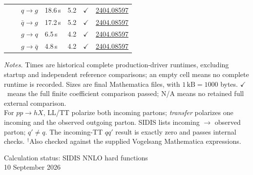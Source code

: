 \documentclass[11pt,a4paper]{article}
\newcommand{\verified}{\textcolor{green!45!black}{\ensuremath{\checkmark}}}
\begin{document}
\begin{center}
\begin{tabular}{|C{2.5cm}|C{1.2cm}|C{2.7cm}|C{2.0cm}|C{1.7cm}|C{1.8cm}|C{2.6cm}|}
 &  & $q\to g$ & 18.6\,s & 5.2 & \verified & \href{https://arxiv.org/abs/2404.08597v3}{2404.08597} \\
 &  & $\bar q\to g$ & 17.2\,s & 5.2 & \verified & \href{https://arxiv.org/abs/2404.08597v3}{2404.08597} \\
 &  & $g\to q$ & 6.5\,s & 4.2 & \verified & \href{https://arxiv.org/abs/2404.08597v3}{2404.08597} \\
 &  & $g\to \bar q$ & 4.8\,s & 4.2 & \verified & \href{https://arxiv.org/abs/2404.08597v3}{2404.08597} \\
\hline
\end{tabular}
\end{center}
\vspace{4pt}
{\footnotesize
\textit{Notes.} Times are historical complete production-driver runtimes,
excluding startup and independent reference comparisons; an empty cell means
no complete runtime is recorded. Sizes are final Mathematica files, with
$1\,\mathrm{kB}=1000$ bytes. \verified\ means the full finite coefficient
comparison passed; N/A means no retained full external comparison.\\[4pt]
For $pp\to hX$, LL/TT polarize both incoming partons; \emph{transfer} polarizes
one incoming and the observed outgoing parton. SIDIS lists incoming $\to$
observed parton; $q'\ne q$. The incoming-TT $qq'$ result is exactly zero and
passes internal checks. $^\dagger$Also checked against the supplied Vogelsang
Mathematica expressions.
}
\newpage
\begin{center}
{\large Calculation status: SIDIS NNLO hard functions}\\[5pt]
{\small 10 September 2026}
\end{center}
\vspace{4pt}
\end{document}
